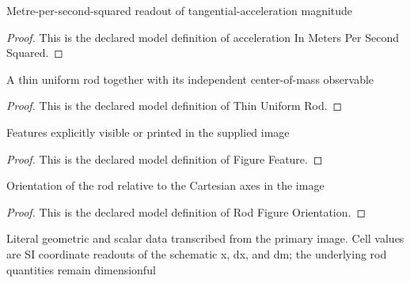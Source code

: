 \begin{definition}
  \label{def:physics:phyx-mini-0697:phyxminiproblems-problemphyxmini0697-accelerationinmeterspersecondsquared}
  Metre-per-second-squared readout of tangential-acceleration magnitude
\end{definition}
\begin{proof}
  This is the declared model definition of acceleration In Meters Per Second Squared.
\end{proof}
\begin{definition}
  \label{def:physics:phyx-mini-0697:phyxminiproblems-problemphyxmini0697-thinuniformrod}
  A thin uniform rod together with its independent center-of-mass observable
\end{definition}
\begin{proof}
  This is the declared model definition of Thin Uniform Rod.
\end{proof}
\begin{definition}
  \label{def:physics:phyx-mini-0697:phyxminiproblems-problemphyxmini0697-figurefeature}
  Features explicitly visible or printed in the supplied image
\end{definition}
\begin{proof}
  This is the declared model definition of Figure Feature.
\end{proof}
\begin{definition}
  \label{def:physics:phyx-mini-0697:phyxminiproblems-problemphyxmini0697-rodfigureorientation}
  Orientation of the rod relative to the Cartesian axes in the image
\end{definition}
\begin{proof}
  This is the declared model definition of Rod Figure Orientation.
\end{proof}
\begin{definition}
  \label{def:physics:phyx-mini-0697:phyxminiproblems-problemphyxmini0697-uniformrodfigure}
  Literal geometric and scalar data transcribed from the primary image. Cell values are SI coordinate readouts of the schematic x, dx, and dm; the underlying rod quantities remain dimensionful
\end{definition}
